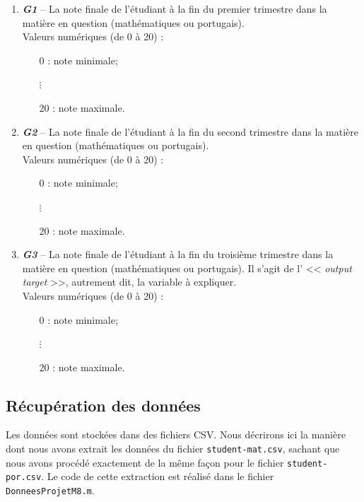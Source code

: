 \documentclass[11pt]{article}
\begin{document}
\begin{enumerate}
\item \textbf{\emph{G1}} \--- La note finale de l'étudiant à la fin du premier trimestre dans la matière en question (mathématiques ou portugais). 
	\\\textsf{Valeurs numériques (de 0 à 20) : }\begin{itemize}
	\item[\textbullet] 0 : note minimale;
	\item[$\vdots$] 
	\item[\textbullet] 20 : note maximale.
	\end{itemize}
	
\item \textbf{\emph{G2}} \--- La note finale de l'étudiant à la fin du second trimestre dans la matière en question (mathématiques ou portugais). 
	\\\textsf{Valeurs numériques (de 0 à 20) : }\begin{itemize}
	\item[\textbullet] 0 : note minimale;
	\item[$\vdots$] 
	\item[\textbullet] 20 : note maximale.
	\end{itemize}


\item \textbf{\emph{G3}} \--- La note finale de l'étudiant à la fin du troisième trimestre dans la matière en question (mathématiques ou portugais). Il s'agit de l' << \emph{output target} >>, autrement dit, la variable à expliquer.
	\\\textsf{Valeurs numériques (de 0 à 20) : }\begin{itemize}
	\item[\textbullet] 0 : note minimale;
	\item[$\vdots$] 
	\item[\textbullet] 20 : note maximale.
	\end{itemize}
	
\end{enumerate}
\renewcommand{\labelenumi}{\theenumi.}
\renewcommand{\labelenumii}{\theenumii.}
\renewcommand{\theenumi}{\arabic{enumi}}
\renewcommand{\theenumii}{\alph{enumii}}

\subsection{Récupération des données}

Les données sont stockées dans des fichiers CSV. Nous décrirons ici la manière dont nous avons extrait les données du fichier \texttt{student-mat.csv}, sachant que nous avons procédé exactement de la même façon pour le fichier \texttt{student-por.csv}. Le code de cette extraction est réalisé dans le fichier \texttt{DonneesProjetM8.m}.
~\\
\end{document}
